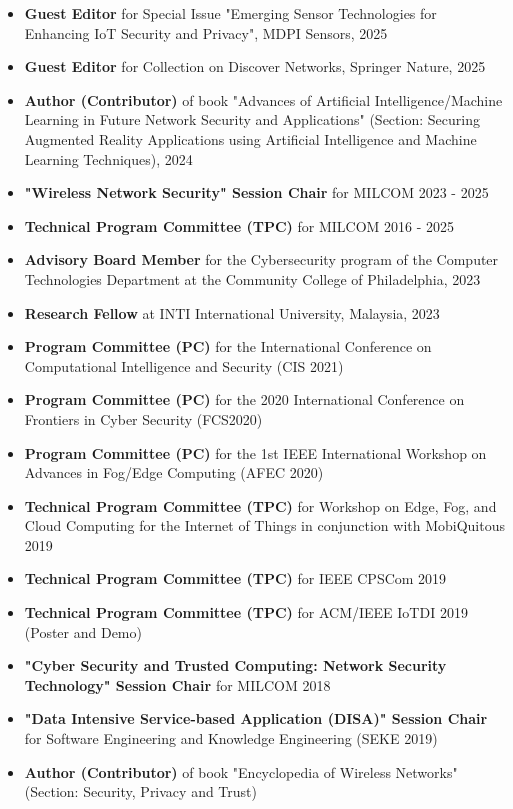 \documentclass[letter]{article}
\begin{document}
\begin{description}
\begin{itemize}
\item \textbf{Guest Editor} for Special Issue "Emerging Sensor Technologies for Enhancing IoT Security and Privacy", MDPI Sensors, 2025
\item \textbf{Guest Editor} for Collection on Discover Networks, Springer Nature, 2025
\item \textbf{Author (Contributor)} of book "Advances of Artificial Intelligence/Machine Learning in Future Network Security and Applications" (Section: Securing Augmented Reality Applications using Artificial Intelligence and Machine Learning Techniques), 2024
\item \textbf{"Wireless Network Security" Session Chair} for MILCOM 2023 - 2025
\item \textbf{Technical Program Committee (TPC)} for MILCOM 2016 - 2025
\item \textbf{Advisory Board Member} for the Cybersecurity program of the Computer Technologies Department at the Community College of Philadelphia, 2023
\item \textbf{Research Fellow} at INTI International University, Malaysia, 2023
\item \textbf{Program Committee (PC)} for the International Conference on Computational Intelligence and Security (CIS 2021)
\item \textbf{Program Committee (PC)} for the 2020 International Conference on Frontiers in Cyber Security (FCS2020)
\item \textbf{Program Committee (PC)} for the 1st IEEE International Workshop on Advances in Fog/Edge Computing (AFEC 2020)
\item \textbf{Technical Program Committee (TPC)} for Workshop on Edge, Fog, and Cloud Computing for the Internet of Things in conjunction with MobiQuitous 2019
\item \textbf{Technical Program Committee (TPC)} for IEEE CPSCom 2019
\item \textbf{Technical Program Committee (TPC)} for ACM/IEEE IoTDI 2019 (Poster and Demo)
\item \textbf{"Cyber Security and Trusted Computing: Network Security Technology" Session Chair} for MILCOM 2018
\item \textbf{"Data Intensive Service-based Application (DISA)" Session Chair} for Software Engineering and Knowledge Engineering (SEKE 2019)
\item \textbf{Author (Contributor)} of book "Encyclopedia of Wireless Networks" (Section: Security, Privacy and Trust)

\end{itemize}
\end{description}
\end{document}

